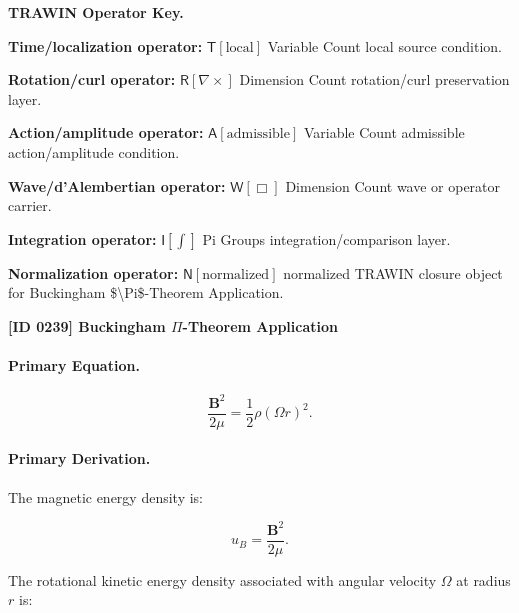 \par\vspace{0.45\baselineskip}
\noindent\begin{minipage}[t]{\linewidth}
\begingroup
\small
\raggedright
\textbf{TRAWIN Operator Key.}\par
\noindent\textbf{Time/localization operator:} $\mathsf{T}\!\left[\mathrm{local}\right]$ Variable Count local source condition.\par
\noindent\textbf{Rotation/curl operator:} $\mathsf{R}\!\left[\nabla\times\right]$ Dimension Count rotation/curl preservation layer.\par
\noindent\textbf{Action/amplitude operator:} $\mathsf{A}\!\left[\mathrm{admissible}\right]$ Variable Count admissible action/amplitude condition.\par
\noindent\textbf{Wave/d'Alembertian operator:} $\mathsf{W}\!\left[\Box\right]$ Dimension Count wave or operator carrier.\par
\noindent\textbf{Integration operator:} $\mathsf{I}\!\left[\int\right]$ Pi Groups integration/comparison layer.\par
\noindent\textbf{Normalization operator:} $\mathsf{N}\!\left[\mathrm{normalized}\right]$ normalized TRAWIN closure object for Buckingham \$\textbackslash{}Pi\$-Theorem Application.\par
\endgroup
\end{minipage}

\clearpage
\noindent\textbf{[ID 0239] Buckingham $\Pi$-Theorem Application}\par
\vspace{0.35em}
\paragraph{Primary Equation.}
\begin{equation}
\frac{\mathbf{B}^2}{2\mu}
=
\frac{1}{2}\rho(\Omega r)^2 .
\end{equation}

\paragraph{Primary Derivation.}
The magnetic energy density is:

\begin{equation}
u_B
=
\frac{\mathbf{B}^2}{2\mu}.
\end{equation}

The rotational kinetic energy density associated with angular velocity $\Omega$ at radius $r$ is:

